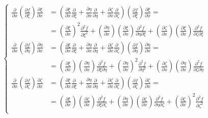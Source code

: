 \documentclass
[
a4paper,                      %
twoside,					  %
12pt,                         %
abstract,		      %
fleqn,                        %
]
{scrartcl} %
\begin{document}
\begin{description}
\begin{equation}
\begin{cases}
\frac{\partial}{\partial x}\left(\frac{\partial f}{\partial\xi}\right)\frac{\partial\xi}{\partial x}&=\left(\frac{\partial\xi}{\partial x}\frac{\partial}{\partial\xi}+\frac{\partial\eta}{\partial x}\frac{\partial}{\partial\eta}+\frac{\partial\zeta}{\partial x}\frac{\partial}{\partial\zeta}\right)\left(\frac{\partial f}{\partial\xi}\right)\frac{\partial\xi}{\partial x}=\\[5pt]
&=\left(\frac{\partial\xi}{\partial x}\right)^{2}\frac{\partial^{2} f}{\partial\xi^{2}}+\left(\frac{\partial\eta}{\partial x}\right)\left(\frac{\partial\xi}{\partial x}\right)\frac{\partial^{2} f}{\partial\eta\partial\xi}+\left(\frac{\partial\zeta}{\partial x}\right)\left(\frac{\partial\xi}{\partial x}\right)\frac{\partial^{2} f}{\partial\zeta\partial\xi}\\[10pt]
\frac{\partial}{\partial x}\left(\frac{\partial f}{\partial\eta}\right)\frac{\partial\eta}{\partial x}&=\left(\frac{\partial\xi}{\partial x}\frac{\partial}{\partial\xi}+\frac{\partial\eta}{\partial x}\frac{\partial}{\partial\eta}+\frac{\partial\zeta}{\partial x}\frac{\partial}{\partial\zeta}\right)\left(\frac{\partial f}{\partial\eta}\right)\frac{\partial\eta}{\partial x}=\\[5pt]
&=\left(\frac{\partial\xi}{\partial x}\right)\left(\frac{\partial\eta}{\partial x}\right)\frac{\partial^{2} f}{\partial\xi\partial\eta}+\left(\frac{\partial\eta}{\partial x}\right)^{2}\frac{\partial^{2} f}{\partial\eta^{2}}+\left(\frac{\partial\zeta}{\partial x}\right)\left(\frac{\partial\eta}{\partial x}\right)\frac{\partial^{2} f}{\partial\zeta\partial\eta}\\[10pt]
\frac{\partial}{\partial x}\left(\frac{\partial f}{\partial\zeta}\right)\frac{\partial\zeta}{\partial x}&=\left(\frac{\partial\xi}{\partial x}\frac{\partial}{\partial\xi}+\frac{\partial\eta}{\partial x}\frac{\partial}{\partial\eta}+\frac{\partial\zeta}{\partial x}\frac{\partial}{\partial\zeta}\right)\left(\frac{\partial f}{\partial\zeta}\right)\frac{\partial\zeta}{\partial x}=\\[5pt]
&=\left(\frac{\partial\xi}{\partial x}\right)\left(\frac{\partial\zeta}{\partial x}\right)\frac{\partial^{2} f}{\partial\xi\partial\zeta}+\left(\frac{\partial\eta}{\partial x}\right)\left(\frac{\partial\zeta}{\partial x}\right)\frac{\partial^{2} f}{\partial\eta\partial\zeta}+\left(\frac{\partial\zeta}{\partial x}\right)^{2}\frac{\partial^{2} f}{\partial\zeta^{2}}\\[5pt]
\end{cases}
\end{equation}


\end{description}
\end{document}
